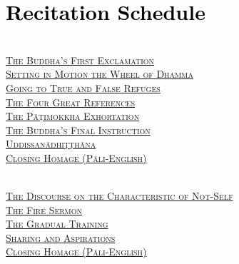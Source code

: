 \section{\textcolor{black}{Recitation Schedule}}
\label{schedule}

\begin{center}

  {\libertinusFont\selectfont\textbf{\textsc{}}}\\

  \textsc{
    \hyperref[buddhas-first-exclamation]{The Buddha's First Exclamation} \pageref{buddhas-first-exclamation}\\
    \hyperref[wheel-of-dhamma-abridged]{Setting in Motion the Wheel of Dhamma} \pageref{wheel-of-dhamma-abridged}\\
    \hyperref[true-false-refuges]{Going to True and False Refuges} \pageref{true-false-refuges}\\
    \hyperref[four-great-references]{The Four Great References} \pageref{four-great-references}\\
    \hyperref[patimokkha-exhortation]{The Pāṭimokkha Exhortation} \pageref{patimokkha-exhortation}\\
    \hyperref[buddhas-final-instruction]{The Buddha's Final Instruction} \pageref{buddhas-final-instruction}\\
    \hyperref[uddissanadhitthana]{Uddissanādhiṭṭhāna} \pageref{uddissanadhitthana}\\
    \hyperref[closing-homage]{Closing Homage (Pāli-English)}} \pageref{closing-homage}\\

  \bigskip

  {\libertinusFont\selectfont\textbf{\textsc{}}}\\

  \textsc{
    \hyperref[characteristic-of-not-self]{The Discourse on the Characteristic of Not-Self} \pageref{characteristic-of-not-self}\\
    \hyperref[fire-sermon]{The Fire Sermon} \pageref{fire-sermon}\\
    \hyperref[gradual-training]{The Gradual Training} \pageref{gradual-training}\\
    \hyperref[sharing-aspirations]{Sharing and Aspirations} \pageref{sharing-aspirations}\\
    \hyperref[closing-homage]{Closing Homage (Pāli-English)}} \pageref{closing-homage}\\


\end{center}
